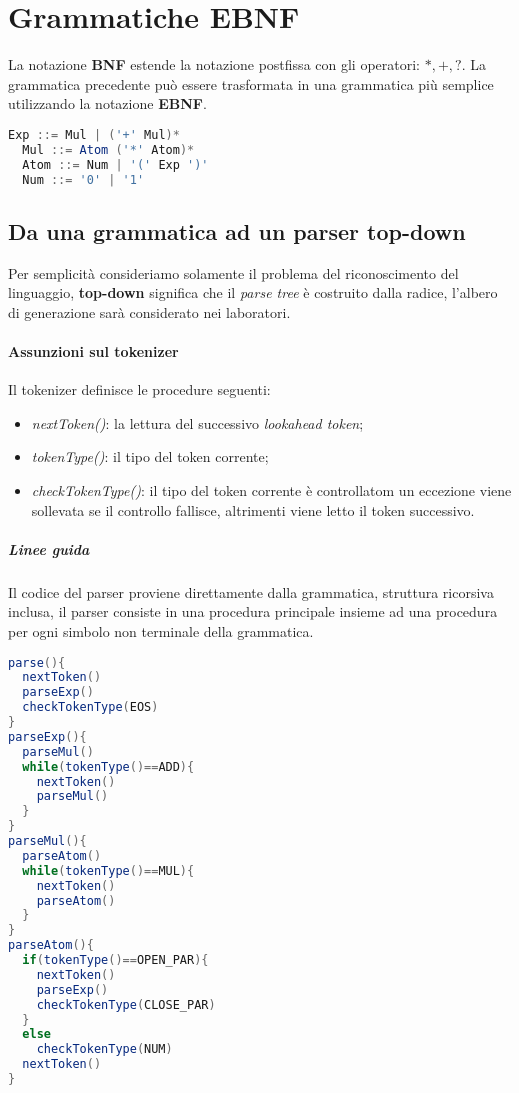 \section{Grammatiche EBNF}
La notazione \textbf{BNF} estende la notazione postfissa con gli operatori:
$*,+,?$.
La grammatica precedente può essere trasformata in una grammatica più semplice
utilizzando la notazione \textbf{EBNF}.

\begin{lstlisting}[language=Java, caption={Soluzione completa utilizando la gammatica ENBNF}]
  Exp ::= Mul | ('+' Mul)*
  Mul ::= Atom ('*' Atom)*
  Atom ::= Num | '(' Exp ')'
  Num ::= '0' | '1'
\end{lstlisting}

\subsection{Da una grammatica ad un parser top-down}
Per semplicità consideriamo solamente il problema del riconoscimento del
linguaggio, \textbf{top-down} significa che il \emph{parse tree} è costruito
dalla radice, l'albero di generazione sarà considerato nei laboratori.

\paragraph{Assunzioni sul tokenizer}
Il tokenizer definisce le procedure seguenti:
\begin{itemize}
  \item \textit{nextToken()}: la lettura del successivo \emph{lookahead token};
  \item \textit{tokenType()}: il tipo del token corrente;
  \item \textit{checkTokenType()}: il tipo del token corrente è controllatom
    un eccezione viene sollevata se il controllo fallisce, altrimenti viene
    letto il token successivo.
\end{itemize}

\subparagraph{Linee guida}
Il codice del parser proviene direttamente dalla grammatica, struttura
ricorsiva inclusa, il parser consiste in una procedura principale insieme ad
una procedura per ogni simbolo non terminale della grammatica.

\begin{lstlisting}[language=Java, caption={Pseudocodice detivara dalla grammatica EBNF precedente}]
parse(){
  nextToken()
  parseExp()
  checkTokenType(EOS)
}
parseExp(){
  parseMul()
  while(tokenType()==ADD){
    nextToken()
    parseMul()
  }
}
parseMul(){
  parseAtom()
  while(tokenType()==MUL){
    nextToken()
    parseAtom()
  }
}
parseAtom(){
  if(tokenType()==OPEN_PAR){
    nextToken()
    parseExp()
    checkTokenType(CLOSE_PAR)
  }
  else
    checkTokenType(NUM)
  nextToken()
}
\end{lstlisting}

